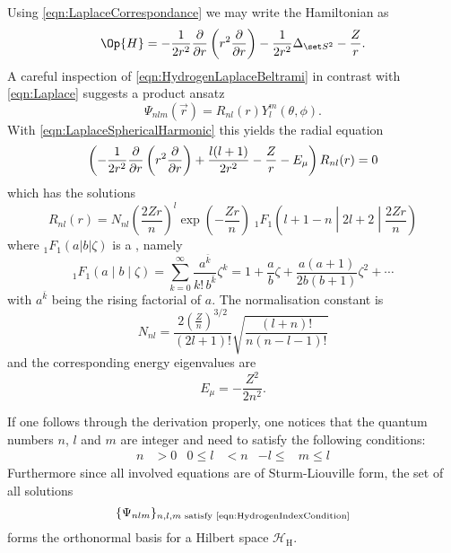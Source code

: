 \noindent
Using \eqref{eqn:LaplaceCorrespondance} we may write the Hamiltonian as
\begin{equation}
	\label{eqn:HydrogenLaplaceBeltrami}
	\Op{H} = -\frac{1}{2r^2} \laplaceRadial -\frac{1}{2r^2} \laplaceSphere - \frac{Z}{r}.
\end{equation}
A careful inspection of \eqref{eqn:HydrogenLaplaceBeltrami}
in contrast with \eqref{eqn:Laplace}
suggests a product ansatz
\[ \Psi_{nlm}(\vec{r}) = R_{nl}(r) Y_l^m(\theta, \phi). \]
%
With \eqref{eqn:LaplaceSphericalHarmonic} this yields the radial equation
\begin{equation}
	\left( - \frac{1}{2r^2} \frac{\partial}{\partial r} \left( r^2 \frac{\partial}{\partial r} \right) + \frac{l (l+1)}{2 r^2} - \frac{Z}{r} - E_\mu \right) R_{nl}(r) = 0
	\label{eqn:HydrogenRadial}
\end{equation}
which has the solutions~\cite{Mueller2000}
\begin{equation}
	 R_{nl}(r) = N_{nl} \left(\frac{2Zr}{n}\right)^l \exp\left(-\frac{Zr}{n} \right)
\;_1F_1\!\left(l+1-n \middle| 2l+2 \middle|\frac{2Zr}{n}\right)
	\label{eqn:HydrogenRadialSolution}
\end{equation}
where $_1F_1\!\left(a|b|\zeta\right)$ is a ,
namely~\cite{Avery2006}
\begin{equation}
	_1F_1\left(a \middle| b \middle| \zeta\right) =
	\sum_{k=0}^\infty \frac{a^{\bar{k}}}{k! \, b^{\bar{k}}} \zeta^k =
	1 + \frac{a}{b} \zeta + \frac{a(a+1)}{2b(b+1)} \zeta^2 + \cdots
	\label{eqn:ConfluentHypergeometric}
\end{equation}
with $a^{\bar{k}}$ being the rising factorial of $a$.
The normalisation constant is
\[ N_{nl} = \frac{2 \left( \frac{Z}{n} \right)^{3/2}}{(2l+1)!} \sqrt{ \frac{(l+n)!}{n (n-l-1)!}} \]
and the corresponding energy eigenvalues are
\begin{equation}
	E_{\mu} = - \frac{Z^2}{2n^2}.
	\label{eqn:HydrogenEnergyLevels}
\end{equation}

If one follows through the derivation properly,
one notices that the quantum numbers $n$, $l$ and $m$ are integer and need to satisfy
the following conditions:
\begin{align}
	\label{eqn:HydrogenIndexCondition}
	n &> 0 & 0 \leq l &< n & -l \leq &m \leq l
\end{align}
Furthermore since all involved equations are of Sturm-Liouville form,
the set of all solutions
\[
	\{\Psi_{nlm} \}_{n,l,m \text{ satisfy \eqref{eqn:HydrogenIndexCondition}}}
\]
forms the orthonormal basis for a Hilbert space $\mathcal{H}_\text{H}$.

